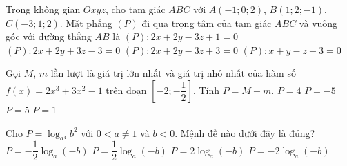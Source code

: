 \begin{ex}%
	Trong không gian $Oxyz$, cho tam giác $ABC$ với $A(-1;0;2)$, $B(1;2;-1)$, $C(-3;1;2)$. Mặt phẳng $(P)$ đi qua trọng tâm của tam giác $ABC$ và vuông góc với đường thẳng $AB$ là
	\choice
	{$(P) \colon 2x+2y-3z+1=0$}
	{$(P) \colon 2x+2y+3z-3=0$}
	{\True $(P) \colon 2x+2y-3z+3=0$}
	{$(P) \colon x+y-z-3=0$}
\end{ex}

\begin{ex}%
	Gọi $M$, $m$ lần lượt là giá trị lớn nhất và giá trị nhỏ nhất của hàm số $f(x)=2x^3+3x^2-1$ trên đoạn $\left[ -2;-\dfrac{1}{2} \right]$. Tính $P=M-m$.
	\choice
	{$P=4$}
	{$P=-5$}
	{\True $P=5$}
	{$P=1$}
\end{ex}

\begin{ex}%
	Cho $P=\log_{a^4} b^2$ với $0<a \ne 1$ và $b<0$. Mệnh đề nào dưới đây là đúng?
	\choice
	{$P=-\dfrac{1}{2} \log_a (-b)$}
	{\True $P=\dfrac{1}{2} \log_a (-b)$}
	{$P= 2\log_a (-b)$}
	{$P= -2\log_a (-b)$}
\end{ex}

